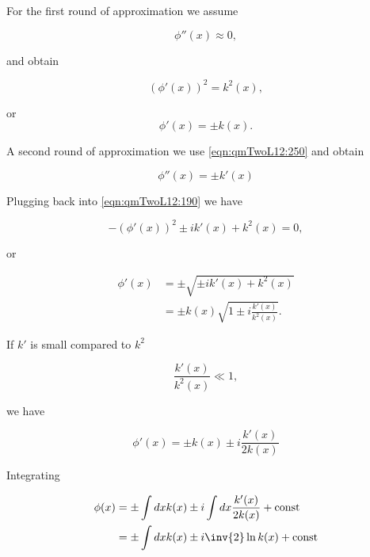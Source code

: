 For the first round of approximation we assume

\begin{equation}\label{eqn:qmTwoL12:210}
\phi''(x) \approx 0,
\end{equation}

and obtain

\begin{equation}\label{eqn:qmTwoL12:230}
(\phi'(x))^2 = k^2(x),
\end{equation}

or
\begin{equation}\label{eqn:qmTwoL12:250}
\phi'(x) = \pm k(x).
\end{equation}

A second round of approximation we use \ref{eqn:qmTwoL12:250} and obtain

\begin{equation}\label{eqn:qmTwoL12:250b}
\phi''(x) = \pm k'(x)
\end{equation}

Plugging back into \ref{eqn:qmTwoL12:190} we have

\begin{equation}\label{eqn:qmTwoL12:270}
-(\phi'(x))^2 \pm i k'(x) + k^2(x) = 0,
\end{equation}

or

\begin{equation}\label{eqn:qmTwoL12:290}
\begin{aligned}
\phi'(x) 
&= \pm \sqrt{ \pm i k'(x) + k^2(x) } \\
&= \pm k(x) \sqrt{ 1 \pm i \frac{k'(x)}{k^2(x)} } .
\end{aligned}
\end{equation}

If $k'$ is small compared to $k^2$

\begin{equation}\label{eqn:qmTwoL12:310}
\frac{k'(x)}{k^2(x)} \ll 1, 
\end{equation}

we have

\begin{equation}\label{eqn:qmTwoL12:330}
\phi'(x) 
= \pm k(x) \pm i \frac{k'(x)}{2 k(x)}  
\end{equation}

Integrating

\begin{align*}
\phi(x) 
&= \pm \int dx k(x) \pm i \int dx \frac{k'(x)}{2 k(x)}  + \text{const} \\
&= \pm \int dx k(x) \pm i \inv{2} \ln k(x) + \text{const} 
\end{align*}

